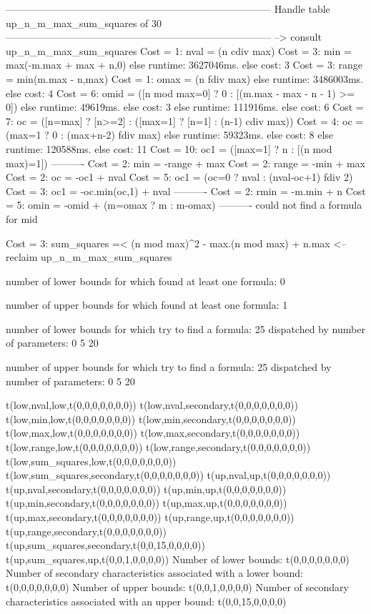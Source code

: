 --------------------------------------------------------------------------------
Handle table up_n_m_max_sum_squares of 30
--------------------------------------------------------------------------------
--> consult up_n_m_max_sum_squares
Cost =  1:  nval  = (n cdiv max)
Cost =  3:  min   = max(-m.max + max + n,0)
else runtime: 3627046ms. else cost: 3
Cost =  3:  range = min(m.max - n,max) %
Cost =  1:  omax  = (n fdiv max)
else runtime: 3486003ms. else cost: 4
Cost =  6:  omid  = ([n mod max=0] ? 0 : [(m.max - max - n - 1) >= 0]) %
else runtime: 49619ms. else cost: 3
else runtime: 111916ms. else cost: 6
Cost =  7:  oc    = ([n=max] ? [n>=2] : ([max=1] ? [n=1] : (n-1) cdiv max)) %
Cost =  4:  oc    = (max=1 ? 0 : (max+n-2) fdiv max)
else runtime: 59323ms. else cost: 8
else runtime: 120588ms. else cost: 11
Cost = 10:  oc1   = ([max=1] ? n : [(n mod max)=1]) %
----------
Cost =  2:  min   = -range + max
Cost =  2:  range = -min + max
Cost =  2:  oc    = -oc1 + nval
Cost =  5:  oc1   = (oc=0 ? nval : (nval-oc+1) fdiv 2)
Cost =  3:  oc1   = -oc.min(oc,1) + nval
----------
Cost =  2:  rmin  = -m.min + n
Cost =  5:  omin  = -omid + (m=omax ? m : m-omax) %
----------
could not find a formula for mid

Cost =  3:  sum_squares =< (n mod max)^2 - max.(n mod max) + n.max
<-- reclaim up_n_m_max_sum_squares

number of lower bounds for which found at least one formula: 0

number of upper bounds for which found at least one formula: 1

number of lower bounds for which try to find a formula: 25
dispatched by number of parameters: 0  5  20

number of upper bounds for which try to find a formula: 25
dispatched by number of parameters: 0  5  20

t(low,nval,low,t(0,0,0,0,0,0,0))
t(low,nval,secondary,t(0,0,0,0,0,0,0))
t(low,min,low,t(0,0,0,0,0,0,0))
t(low,min,secondary,t(0,0,0,0,0,0,0))
t(low,max,low,t(0,0,0,0,0,0,0))
t(low,max,secondary,t(0,0,0,0,0,0,0))
t(low,range,low,t(0,0,0,0,0,0,0))
t(low,range,secondary,t(0,0,0,0,0,0,0))
t(low,sum_squares,low,t(0,0,0,0,0,0,0))
t(low,sum_squares,secondary,t(0,0,0,0,0,0,0))
t(up,nval,up,t(0,0,0,0,0,0,0))
t(up,nval,secondary,t(0,0,0,0,0,0,0))
t(up,min,up,t(0,0,0,0,0,0,0))
t(up,min,secondary,t(0,0,0,0,0,0,0))
t(up,max,up,t(0,0,0,0,0,0,0))
t(up,max,secondary,t(0,0,0,0,0,0,0))
t(up,range,up,t(0,0,0,0,0,0,0))
t(up,range,secondary,t(0,0,0,0,0,0,0))
t(up,sum_squares,secondary,t(0,0,15,0,0,0,0))
t(up,sum_squares,up,t(0,0,1,0,0,0,0))
Number of lower bounds:                                             t(0,0,0,0,0,0,0)
Number of secondary characteristics associated with a lower bound:  t(0,0,0,0,0,0,0)
Number of upper bounds:                                             t(0,0,1,0,0,0,0)
Number of secondary characteristics associated with an upper bound: t(0,0,15,0,0,0,0)

